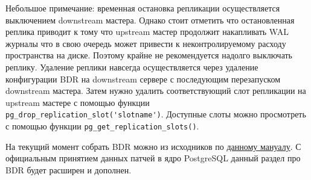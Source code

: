 Небольшое примечание: временная остановка репликации осуществляется выключением downstream мастера. Однако стоит отметить что остановленная реплика приводит к тому что upstream мастер продолжит накапливать WAL журналы что в свою очередь может привести к неконтролируемому расходу пространства на диске. Поэтому крайне не рекомендуется надолго выключать реплику. Удаление реплики навсегда осуществляется через удаление конфигурации BDR на downstream сервере с последующим перезапуском downstream мастера. Затем нужно удалить соответствующий слот репликации на upstream мастере с помощью функции \lstinline!pg_drop_replication_slot('slotname')!. Доступные слоты можно просмотреть с помощью функции \lstinline!pg_get_replication_slots()!.

На текущий момент собрать BDR можно из исходников по \href{https://wiki.postgresql.org/wiki/BDR_Quick_Start}{данному мануалу}. С официальным принятием данных патчей в ядро PostgreSQL данный раздел про BDR будет расширен и дополнен.